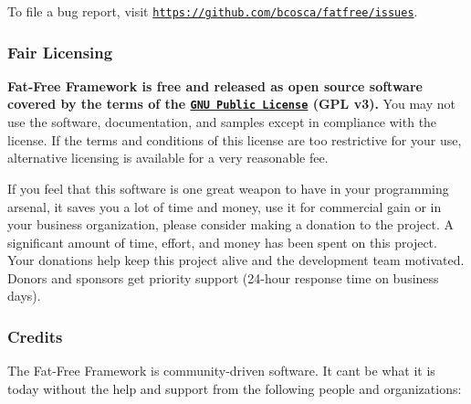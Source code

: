 To file a bug report, visit \href{https://github.com/bcosca/fatfree/issues}{\tt {\ttfamily https\+://github.\+com/bcosca/fatfree/issues}}.

\subsubsection*{Fair Licensing}

{\bfseries Fat-\/\+Free Framework is free and released as open source software covered by the terms of the \href{http://www.gnu.org/licenses/gpl-3.0.html}{\tt G\+NU Public License} (G\+PL v3).} You may not use the software, documentation, and samples except in compliance with the license. If the terms and conditions of this license are too restrictive for your use, alternative licensing is available for a very reasonable fee.

If you feel that this software is one great weapon to have in your programming arsenal, it saves you a lot of time and money, use it for commercial gain or in your business organization, please consider making a donation to the project. A significant amount of time, effort, and money has been spent on this project. Your donations help keep this project alive and the development team motivated. Donors and sponsors get priority support (24-\/hour response time on business days).

\subsubsection*{Credits}

The Fat-\/\+Free Framework is community-\/driven software. It can\textquotesingle{}t be what it is today without the help and support from the following people and organizations\+:


